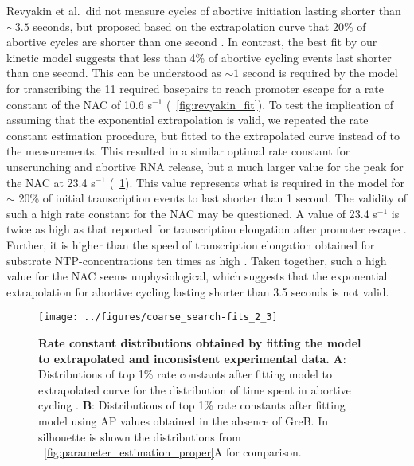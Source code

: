 Revyakin et al.\ did not measure cycles of abortive initiation lasting shorter
than $\sim 3.5$ seconds, but proposed based on the extrapolation curve that 20\% of
abortive cycles are shorter than one second \cite{revyakin_abortive_2006}. In
contrast, the best fit by our kinetic model suggests that less than 4\% of
abortive cycling events last shorter than one second. This can be understood
as $\sim 1$ second is required by the model for transcribing the 11 required
basepairs to reach promoter escape for a rate constant of the NAC of 10.6
s$^{-1}$ (\FIG~\ref{fig:revyakin_fit}). To test the implication of assuming
that the exponential extrapolation is valid, we repeated the rate constant
estimation procedure, but fitted to the extrapolated curve instead of to the
measurements. This resulted in a similar optimal rate constant for
unscrunching and abortive RNA release, but a much larger value for the peak
for the NAC at 23.4 s$^{-1}$ (\FIG~\ref{fig:extrap_and_GreB_minus_fit}). This
value represents what is required in the model for $\sim$ 20\% of initial
transcription events to last shorter than 1 second. The validity of such a
high rate constant for the NAC may be questioned. A value of 23.4 s$^{-1}$ is
twice as high as that reported for transcription elongation after promoter
escape \cite{revyakin_abortive_2006}. Further, it is higher than the speed of
transcription elongation obtained for substrate NTP-concentrations ten times
as high \cite{bai_mechanochemical_2007}. Taken together, such a high value for
the NAC seems unphysiological, which suggests that the exponential
extrapolation for abortive cycling lasting shorter than 3.5 seconds is not
valid.

\begin{figure}[h]
    \begin{center}
      \texttt{[image: ../figures/coarse\_search-fits\_2\_3]}
    \end{center}
    \caption{
      {\bf Rate constant distributions obtained by fitting the model to
      extrapolated and inconsistent experimental data.} \textbf{A}:
      Distributions of top 1\% rate constants after fitting model to
      extrapolated curve for the distribution of time spent in abortive
      cycling \cite{revyakin_abortive_2006}. \textbf{B}: Distributions of top
      1\% rate constants after fitting model using AP values obtained in the
      absence of GreB. In silhouette is shown the distributions from
      \FIG~\ref{fig:parameter_estimation_proper}A for comparison.}
      \label{fig:extrap_and_GreB_minus_fit}
\end{figure}

